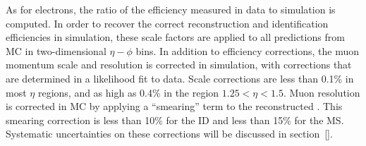 As for electrons, the ratio of the efficiency measured in data to
simulation is computed. In order to recover the correct reconstruction
and identification efficiencies in simulation, these scale factors are
applied to all predictions from MC in two-dimensional $\eta-\phi$
bins. In addition to efficiency corrections, the muon momentum scale
and resolution is corrected in simulation, with corrections that are
determined in a likelihood fit to data. Scale corrections are less
than 0.1\% in most $\eta$ regions, and as high as 0.4\% in the region
$1.25 < \eta < 1.5$. Muon resolution is corrected in MC by applying a
``smearing'' term to the reconstructed \pt. This smearing correction is
less than 10\% for the ID and less than 15\% for the MS. Systematic
uncertainties on these corrections will be discussed in section~\ref{}.
